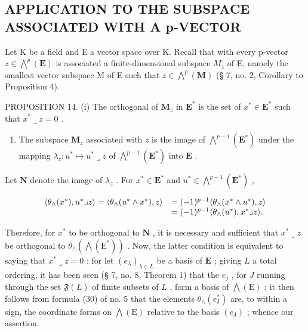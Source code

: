 \subsection{APPLICATION TO THE SUBSPACE ASSOCIATED WITH A p-VECTOR}

Let K be a field and E a vector space over K. Recall that with every p-vector \(z \in \bigwedge^{p}(\mathbf{E})\) is associated a finite-dimensional subspace \(M_{z}\) of E, namely the smallest vector subspace M of E such that \(z \in \bigwedge^{p}(\mathbf{M})\) (§ 7, no. 2, Corollary to Proposition 4).

PROPOSITION 14. (i) The orthogonal of \(\mathbf{M}_z\) in \(\mathbf{E}^*\) is the set of \(x^{*}\in \mathbf{E}^{*}\) such that \(x^{*}\lrcorner z = 0\) .

\begin{enumerate}
\def\labelenumi{(\roman{enumi})}
\setcounter{enumi}{1}
\tightlist
\item
  The subspace \(\mathbf{M}_z\) associated with \(z\) is the image of \(\bigwedge^{p-1}(\mathbf{E}^*)\) under the mapping \(\lambda_z: u^* \mapsto u^* \lrcorner z\) of \(\bigwedge^{p-1}(\mathbf{E}^*)\) into \(\mathbf{E}\) .
\end{enumerate}

Let \(\mathbf{N}\) denote the image of \(\lambda_z\) . For \(x^* \in \mathbf{E}^*\) and \(u^* \in \bigwedge^{p-1}(\mathbf{E}^*)\) ,

\[
\begin{array}{r l} \langle \theta_ {\wedge} (x ^ {*}), u ^ {*} \lrcorner z \rangle = \langle \theta_ {\wedge} (u ^ {*} \wedge x ^ {*}), z \rangle & = (- 1) ^ {p - 1} \langle \theta_ {\wedge} (x ^ {*} \wedge u ^ {*}), z \rangle \\ & = (- 1) ^ {p - 1} \langle \theta_ {\wedge} (u ^ {*}), x ^ {*} \lrcorner z \rangle . \end{array}
\]

Therefore, for \(x^*\) to be orthogonal to \(\mathbf{N}\) , it is necessary and sufficient that \(x^* \lrcorner z\) be orthogonal to \(\theta_\wedge (\bigwedge (\mathrm{E}^*))\) . Now, the latter condition is equivalent to saying that \(x^* \lrcorner z = 0\) ; for let \((e_\lambda)_{\lambda \in L}\) be a basis of \(\mathbf{E}\) ; giving \(L\) a total ordering, it has been seen (§ 7, no. 8, Theorem 1) that the \(e_j\) , for \(J\) running through the set \(\mathfrak{F}(L)\) of finite subsets of \(L\) , form a basis of \(\bigwedge (\mathrm{E})\) ; it then follows from formula (30) of no. 5 that the elements \(\theta_{\wedge}(e_{\mathrm{J}}^{*})\) are, to within a sign, the coordinate forms on \(\bigwedge(\mathrm{E})\) relative to the basis \((e_{\mathrm{J}})\) ; whence our assertion.

